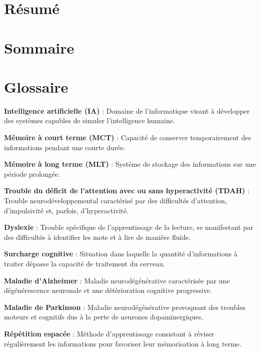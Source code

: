 \documentclass[12pt,a4paper]{report}
\begin{document}
\chapter*{Résumé}

\chapter*{Sommaire}
\tableofcontents

\listoffigures
\listoftables
\newpage

\chapter*{Glossaire}

\textbf{Intelligence artificielle (IA)} : Domaine de l'informatique visant à développer des systèmes capables de simuler l'intelligence humaine.

\textbf{Mémoire à court terme (MCT)} : Capacité de conserver temporairement des informations pendant une courte durée.

\textbf{Mémoire à long terme (MLT)} : Système de stockage des informations sur une période prolongée.

\textbf{Trouble du déficit de l'attention avec ou sans hyperactivité (TDAH)} : Trouble neurodéveloppemental caractérisé par des difficultés d'attention, d'impulsivité et, parfois, d'hyperactivité.

\textbf{Dyslexie} : Trouble spécifique de l'apprentissage de la lecture, se manifestant par des difficultés à identifier les mots et à lire de manière fluide.

\textbf{Surcharge cognitive} : Situation dans laquelle la quantité d'informations à traiter dépasse la capacité de traitement du cerveau.

\textbf{Maladie d'Alzheimer} : Maladie neurodégénérative caractérisée par une dégénérescence neuronale et une détérioration cognitive progressive.

\textbf{Maladie de Parkinson} : Maladie neurodégénérative provoquant des troubles moteurs et cognitifs dus à la perte de neurones dopaminergiques.

\textbf{Répétition espacée} : Méthode d'apprentissage consistant à réviser régulièrement les informations pour favoriser leur mémorisation à long terme.
\end{document}
